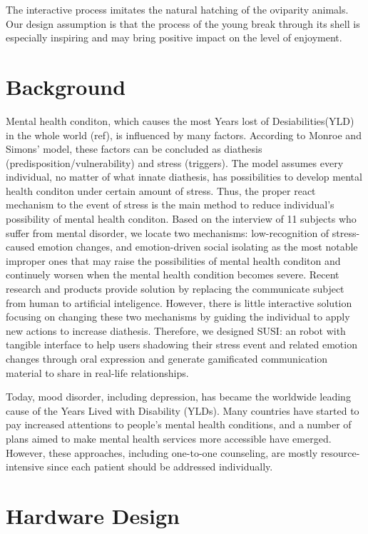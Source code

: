 \documentclass[manuscript,screen]{acmart}
\begin{document}
The interactive process imitates the natural hatching of the oviparity animals. Our design assumption is that the process of the young break through its shell is especially inspiring and may bring positive impact on the level of enjoyment.

\section{Background}

Mental health conditon, which causes the most Years lost of Desiabilities(YLD) in the whole world (ref), is influenced by many factors. According to Monroe and Simons' model, these factors can be concluded as diathesis (predisposition/vulnerability) and stress (triggers). The model assumes every individual, no matter of what innate diathesis, has possibilities to develop mental health conditon under certain amount of stress. Thus, the proper react mechanism to the event of stress is the main method to reduce individual's possibility of mental health conditon. Based on the interview of 11 subjects who suffer from mental disorder, we locate two mechanisms: low-recognition of stress-caused emotion changes, and emotion-driven social isolating as the most notable improper ones that may raise the possibilities of mental health conditon and continuely worsen when the mental health condition becomes severe. Recent research and products provide solution by replacing the communicate subject from human to artificial inteligence. However, there is little interactive solution focusing on changing these two mechanisms by guiding the individual to apply new actions to increase diathesis. Therefore, we designed SUSI: an robot with tangible interface to help users shadowing their stress event and related emotion changes through oral expression and generate gamificated communication material to share in real-life relationships.

Today, mood disorder, including depression, has became the worldwide leading cause of the Years Lived with Disability (YLDs). Many countries have started to pay increased attentions to people’s mental health conditions, and a number of plans aimed to make mental health services more accessible have emerged. However, these approaches, including one-to-one counseling, are mostly resource-intensive since each patient should be addressed individually.





\section{Hardware Design}
\end{document}
